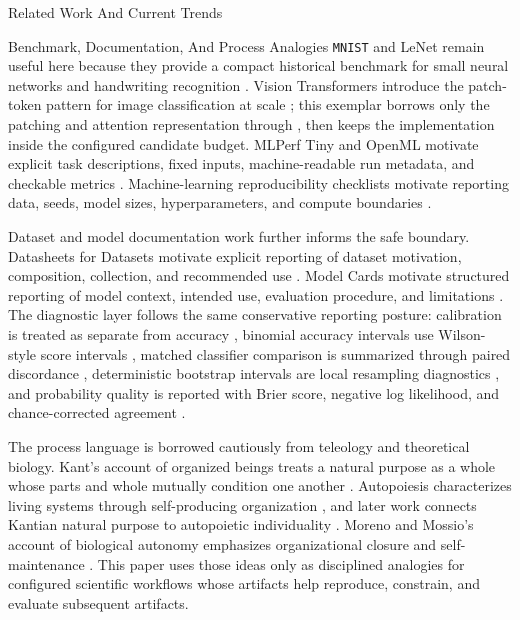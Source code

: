 \documentclass[
  ignorenonframetext,
]{beamer}
\begin{document}
\begin{frame}{Related Work And Current Trends}
\begin{block}{Benchmark, Documentation, And Process Analogies}
\protect{}\label{sec:benchmark-documentation-process-analogies}
\texttt{MNIST} and LeNet remain useful here because they provide a
compact historical benchmark for small neural networks and handwriting
recognition .
Vision Transformers introduce the patch-token pattern for image
classification at scale ; this exemplar
borrows only the patching and attention representation through
, then keeps the
implementation inside the configured candidate budget. MLPerf Tiny and
OpenML motivate explicit task descriptions, fixed inputs,
machine-readable run metadata, and checkable metrics
.
Machine-learning reproducibility checklists motivate reporting data,
seeds, model sizes, hyperparameters, and compute boundaries
.

Dataset and model documentation work further informs the safe boundary.
Datasheets for Datasets motivate explicit reporting of dataset
motivation, composition, collection, and recommended use
. Model Cards motivate structured reporting of
model context, intended use, evaluation procedure, and limitations
. The diagnostic layer follows the same
conservative reporting posture: calibration is treated as separate from
accuracy , binomial accuracy intervals use
Wilson-style score intervals ,
matched classifier comparison is summarized through paired discordance
, deterministic bootstrap
intervals are local resampling diagnostics ,
and probability quality is reported with Brier score, negative log
likelihood, and chance-corrected agreement .

The process language is borrowed cautiously from teleology and
theoretical biology. Kant's account of organized beings treats a natural
purpose as a whole whose parts and whole mutually condition one another
. Autopoiesis characterizes
living systems through self-producing organization
, and later work connects Kantian
natural purpose to autopoietic individuality
. Moreno and Mossio's
account of biological autonomy emphasizes organizational closure and
self-maintenance . This
paper uses those ideas only as disciplined analogies for configured
scientific workflows whose artifacts help reproduce, constrain, and
evaluate subsequent artifacts.


\end{block}
\end{frame}
\end{document}
